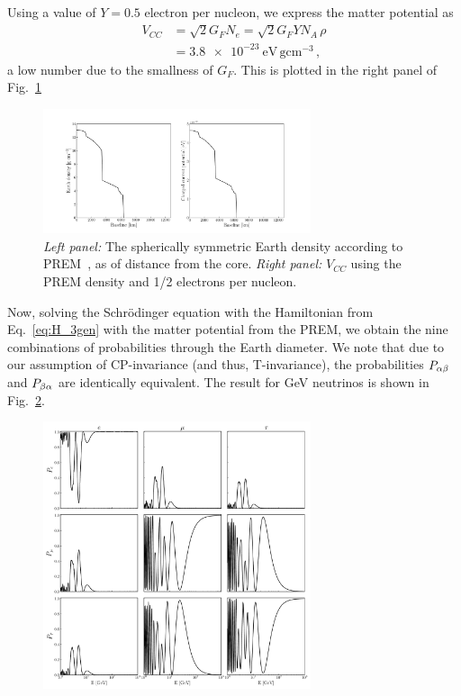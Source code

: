 Using a value of $Y=0.5$ electron per nucleon, we express the matter potential as
\begin{align}
    V_{CC} &= \sqrt{2}G_F N_e = \sqrt{2}G_F Y N_A \,\rho \nonumber \\
           &= \SI{3.8e-23}{\eV\, \gram \cm^{-3}}\,,
\end{align}
a low number due to the smallness of $G_F$. This is plotted in the right panel of Fig.~\ref{fig:potential}
\begin{figure}
    \centering
    \includegraphics[width=0.7\textwidth]{figures/potential.pdf}
    \caption{\emph{Left panel:} The spherically symmetric Earth density according to PREM~\cite{PREM}, as of distance from the core.
    \emph{Right panel:} $V_{CC}$ using the PREM density and 1/2 electrons per nucleon.}\label{fig:potential}
\end{figure}

Now, solving the Schrödinger equation with the Hamiltonian from Eq.~\ref{eq:H_3gen} with the matter potential from the PREM,
we obtain the nine combinations of probabilities through the Earth diameter. We note that due to our assumption of CP-invariance
(and thus, T-invariance), the probabilities $P_{\alpha\beta}$ and $P_{\beta\alpha}$ are identically equivalent. The result for \si{\GeV} neutrinos 
is shown in Fig.~\ref{fig:oscillations}.

\begin{figure}
    \centering
    \includegraphics[width=0.7\textwidth]{figures/oscillations.pdf}
    \caption{}\label{fig:oscillations}
\end{figure}

